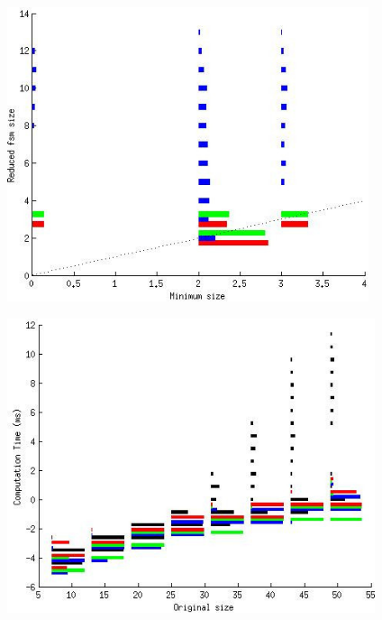 \documentclass{beamer}
\begin{document}
\begin{frame}
\begin{figure}
\centering
\includegraphics[height=3.4in]{patho_exact.jpg}
\end{figure}
\end{frame}

\begin{frame}
\begin{figure}
\centering
\includegraphics[height=3.4in]{patho_time.jpg}
\end{figure}
\end{frame}

\end{document}
